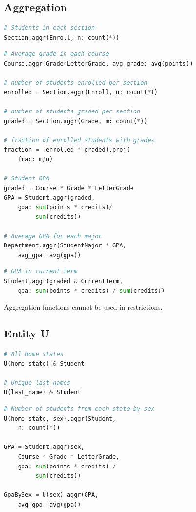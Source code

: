 \documentclass[letter,10pt]{article}
\begin{document}
\subsection{Aggregation}\label{sec:aggr}
\begin{lstlisting}[language=Python, caption={Calculate summary statistics.}, label={lst:aggr1}]
# Students in each section
Section.aggr(Enroll, n: count(*))
\end{lstlisting}

\begin{lstlisting}[language=Python, caption={Aggregation in expressions.}, label={lst:aggr2}]
# Average grade in each course
Course.aggr(Grade*LetterGrade, avg_grade: avg(points))

# number of students enrolled per section
enrolled = Section.aggr(Enroll, n: count(*))

# number of students graded per section
graded = Section.aggr(Grade, m: count(*))

# fraction of enrolled students with grades
fraction = (enrolled * graded).proj(
    frac: m/n)

# Student GPA
graded = Course * Grade * LetterGrade
GPA = Student.aggr(graded,
    gpa: sum(points * credits)/
         sum(credits))

# Average GPA for each major
Department.aggr(StudentMajor * GPA, 
    avg_gpa: avg(gpa))
\end{lstlisting}

\begin{lstlisting}[language=Python, caption={Reuse of variables}, label={lst:aggr3}]
# GPA in current term
Student.aggr(graded & CurrentTerm, 
    gpa: sum(points * credits) / sum(credits))
\end{lstlisting}

Aggregation functions cannot be used in restrictions. 
\subsection{Entity U}\label{sec:u}
\begin{lstlisting}[language=Python, morekeywords={avg, U}, caption={Creating a new entity.}, label={lst:u1}]
# All home states
U(home_state) & Student

# Unique last names
U(last_name) & Student 
\end{lstlisting}

\begin{lstlisting}[language=Python, morekeywords={avg, U}, caption={Aggregation by a new entity.}, label={lst:u2}]
# Number of students from each state by sex
U(home_state, sex).aggr(Student, 
    n: count(*))

GPA = Student.aggr(sex,
    Course * Grade * LetterGrade,
    gpa: sum(points * credits) /
         sum(credits))

GpaBySex = U(sex).aggr(GPA, 
    avg_gpa: avg(gpa))
\end{lstlisting}
\end{document}
